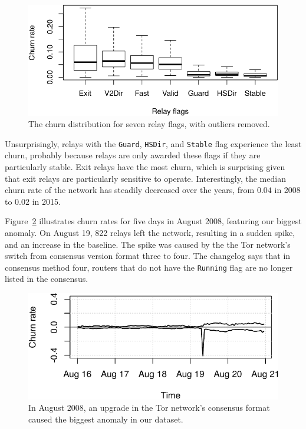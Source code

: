 \begin{figure}[t]
	\centering
	\includegraphics[width=\linewidth]{diagrams/churn-boxplot.pdf}
	\caption{The churn distribution for seven relay flags, with outliers
	removed.}
	\label{fig:churn-boxplot}
\end{figure}

Unsurprisingly, relays with the \texttt{Guard}, \texttt{HSDir}, and
\texttt{Stable} flag experience the least churn, probably because relays are
only awarded these flags if they are particularly stable.  Exit relays have the
most churn, which is surprising given that exit relays are particularly
sensitive to operate.  Interestingly, the median churn rate of the network has
steadily decreased over the years, from $0.04$ in 2008 to $0.02$ in 2015.

Figure~\ref{fig:2008-08} illustrates churn rates for five days in August 2008,
featuring our biggest anomaly.  On August 19, 822 relays left the network,
resulting in a sudden spike, and an increase in the baseline.  The spike was
caused by the the Tor network's switch from consensus version format three to
four.  The changelog says that in consensus method four, routers that do not
have the \texttt{Running} flag are no longer listed in the consensus.

\begin{figure}[t]
	\centering
	\includegraphics[width=\linewidth]{diagrams/2008-08.pdf}
	\caption{In August 2008, an upgrade in the Tor network's consensus format
		caused the biggest anomaly in our dataset.}
	\label{fig:2008-08}
\end{figure}


